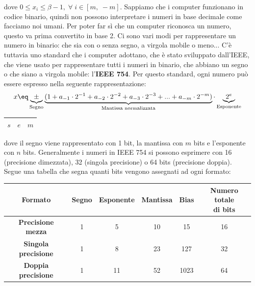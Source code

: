 dove $0 \leq x_i \leq \beta - 1, \; \forall \; i \in [m, \; -m]$.
\nwl
Sappiamo che i computer funzionano in codice binario, quindi non possono interpretare i numeri in base decimale come facciamo noi umani. Per poter far sì che un computer riconosca un numero, questo va prima convertito in base 2. Ci sono vari modi per rappresentare un numero in binario: che sia con o senza segno, a virgola mobile o meno... C'è tuttavia uno standard che i computer adottano, che è stato sviluppato dall'IEEE, che viene usato per rappresentare tutti i numeri in binario, che abbiano un segno o che siano a virgola mobile: l'\textbf{IEEE 754}.
\nwl
Per questo standard, ogni numero può essere espresso nella seguente rappresentazione:
\[ x \eq \underbrace{\pm}_{\text{Segno}} \underbrace{(1 + a_{-1} \cdot 2^{-1} + a_{-2} \cdot 2^{-2} + a_{-3} \cdot 2^{-3} + ... + a_{-m} \cdot 2^{-m})}_{\text{Mantissa normalizzata}} \cdot \underbrace{2^e}_{\text{Esponente}} \]
\begin{center}
    \begin{tabular}{|c||c||c|}
        \hline
        $s$ & \hspace{1cm}$e$\hspace{1cm} & \hspace{3cm}$m$\hspace{3cm} \\
        \hline
    \end{tabular}
\end{center}

dove il segno viene rappresentato con 1 bit, la mantissa con $m$ bits e l'esponente con $n$ bits. Generalmente i numeri in IEEE 754 si possono esprimere con 16 (precisione dimezzata), 32 (singola precisione) o 64 bits (precisione doppia). Segue una tabella che segna quanti bits vengono assegnati ad ogni formato:
\begin{center}
    \begin{tabular}{|c|c|c|c|c|c|}
        \hline
        \textbf{Formato} & \textbf{Segno} & \textbf{Esponente} & \textbf{Mantissa} & \textbf{Bias} & \makecell{\textbf{Numero totale}\\\textbf{di bits}} \\
        \hline\hline
        \textbf{Precisione mezza} & 1 & 5 & 10 & 15 & 16 \\
        \hline
        \textbf{Singola precisione} & 1 & 8 & 23 & 127 & 32 \\
        \hline
        \textbf{Doppia precisione} & 1 & 11 & 52 & 1023 & 64 \\
        \hline
    \end{tabular}
\end{center}

